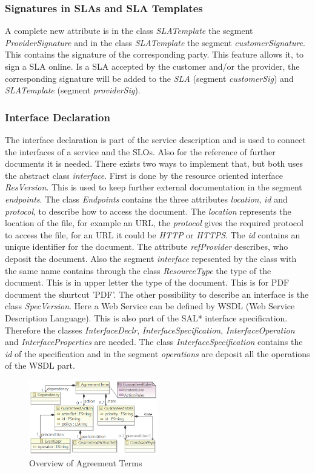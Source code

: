 \subsubsection{Signatures in SLAs and SLA Templates}
A complete new attribute is in the class {\it SLATemplate} the segment {\it ProviderSignature} and in the class  {\it SLATemplate} the segment {\it customerSignature}. This contains the signature of the corresponding party. This feature allows it, to sign a SLA online. Is a SLA accepted by the customer and/or the provider, the corresponding signature will be added to the {\it SLA} (segment {\it customerSig}) and {\it SLATemplate} (segment {\it providerSig}).

\subsubsection{Interface Declaration}
The interface declaration is part of the service description and is used to connect the interfaces of a service and the SLOs. Also for the reference of further documents it is needed. There exists two ways to implement that, but both uses the abstract class {\it interface}. First is done by the resource oriented
interface {\it ResVersion}. This is used to keep further external documentation in the segment {\it endpoints}. The class {\it Endpoints} contains the three attributes {\it location}, {\it id} and {\it protocol}, to describe how to access the document. The {\it location} represents the location of the file, for example an URL, the {\it protocol} gives the required protocol to access the file, for an URL it could be {\it HTTP} or {\it HTTPS}. The {\it id} contains an unique identifier for the document. The attribute {\it refProvider} describes, who deposit the document. Also the segment {\it interface} repesented by the class with the same name contains through the class {\it ResourceType} the type of the document. This is in upper letter the type of the document. This is for PDF document the shurtcut 'PDF'.
The other possibility to describe an interface is the class {\it SpecVersion}. Here a Web Service can be defined by WSDL (Web Service Description Language). This is also part of the SAL* interface specification. Therefore the classes {\it InterfaceDeclr}, {\it InterfaceSpecification}, {\it InterfaceOperation} and {\it InterfaceProperties} are needed. The class {\it InterfaceSpecification} contains the {\it id} of the specification and in the segment {\it operations} are deposit all the operations of the WSDL part.
\begin{figure}[ht]
\includegraphics[width=0.5\textwidth]{fig/sloa_agreement_term.png}
\caption{Overview of Agreement Terms}
\label{fig:overview_AT}
\end{figure}

